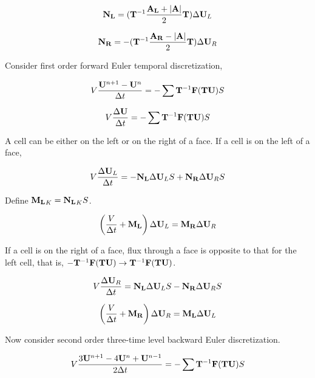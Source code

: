 \documentclass{article}
\begin{document}
\begin{equation}
    \mathbf{N_L}
    =
    (\mathbf{T}^{-1}\frac{\mathbf{A_L} + \lvert\mathbf{A}\rvert}{2}\mathbf{T})\Delta\mathbf{U}_L
\end{equation}

\begin{equation}
    \mathbf{N_R}
    =
    -(\mathbf{T}^{-1}\frac{\mathbf{A_R} - \lvert\mathbf{A}\rvert}{2}\mathbf{T})\Delta\mathbf{U}_R
\end{equation}

Consider first order forward Euler temporal discretization,

\begin{equation}
    V\frac{\mathbf{U}^{n+1} - \mathbf{U}^{n}}{\Delta t}
    =
    -\sum\mathbf{T}^{-1}\mathbf{F}(\mathbf{T}\mathbf{U})S
\end{equation}

\begin{equation}
    V\frac{\Delta\mathbf{U}}{\Delta t}
    =
    -\sum\mathbf{T}^{-1}\mathbf{F}(\mathbf{T}\mathbf{U})S
\end{equation}

A cell can be either on the left or on the right of a face. If a cell is on the left of a face,

\begin{equation}
    V\frac{\Delta\mathbf{U}_L}{\Delta t}
    =
    -\mathbf{N_L}\Delta\mathbf{U}_LS
    +
    \mathbf{N_R}\Delta\mathbf{U}_RS
\end{equation}

Define $\mathbf{M_L}_K = \mathbf{N_L}_K S$.

\begin{equation}
    \left(
        \frac{V}{\Delta t} + \mathbf{M_L}
    \right)
    \Delta\mathbf{U}_L
    =
    \mathbf{M_R}\Delta\mathbf{U}_R
\end{equation}

If a cell is on the right of a face, flux through a face is opposite to that for the left cell, that is, $-\mathbf{T}^{-1}\mathbf{F}(\mathbf{T}\mathbf{U}) \rightarrow \mathbf{T}^{-1}\mathbf{F}(\mathbf{T}\mathbf{U})$.

\begin{equation}
    V\frac{\Delta\mathbf{U}_R}{\Delta t}
    =
    \mathbf{N_L}\Delta\mathbf{U}_LS
    -
    \mathbf{N_R}\Delta\mathbf{U}_RS
\end{equation}

\begin{equation}
    \left(
        \frac{V}{\Delta t} + \mathbf{M_R}
    \right)
    \Delta\mathbf{U}_R
    =
    \mathbf{M_L}\Delta\mathbf{U}_L
\end{equation}

Now consider second order three-time level backward Euler discretization.

\begin{equation}
    V\frac{3\mathbf{U}^{n+1}-4\mathbf{U}^n+\mathbf{U}^{n-1}}{2\Delta t}
    =
    -\sum\mathbf{T}^{-1}\mathbf{F}(\mathbf{T}\mathbf{U})S
\end{equation}
\end{document}
